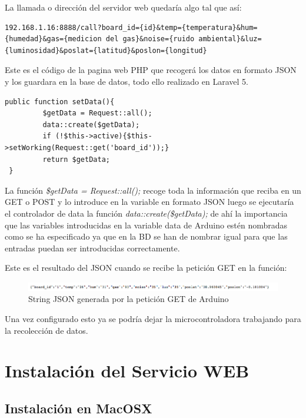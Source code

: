 La llamada o dirección del servidor web quedaría algo tal que así: 

\begin{lstlisting}[caption=Formato de la String GET, label=getstring]
	192.168.1.16:8888/call?board_id={id}&temp={temperatura}&hum={humedad}&gas={medicion del gas}&noise={ruido ambiental}&luz={luminosidad}&poslat={latitud}&poslon={longitud}
\end{lstlisting}

Este es el código de la pagina web PHP que recogerá los datos en formato JSON y los guardara en la base de datos, todo ello realizado en Laravel 5.

\begin{lstlisting}[caption=Controller que almacena la String en la BD, label=getstring]
 public function setData(){
		 $getData = Request::all();
		 data::create($getData);
		 if (!$this->active){$this->setWorking(Request::get('board_id'));}
		 return $getData;
 }
\end{lstlisting}

La función \textit{\$getData = Request::all();} recoge toda la información que reciba en un GET o POST y lo introduce en la variable en formato JSON luego se ejecutaría el controlador de data la función \textit{data::create(\$getData);} de ahí la importancia que las variables introducidas en la variable data de Arduino estén nombradas como se ha especificado ya que en la BD se han de nombrar igual para que las entradas puedan ser introducidas correctamente.

Este es el resultado del JSON cuando se recibe la petición GET en la función:

\begin{figure}[!h]
	\centering
	\includegraphics[width=1.0\linewidth]{figuras/jsonstring}
	\caption{String JSON generada por la petición GET de Arduino}
	\label{fig:montfin}
\end{figure}

Una vez configurado esto ya se podría dejar la microcontroladora trabajando para la recolección de datos.

\section{Instalación del Servicio WEB}
\subsection{Instalación en MacOSX}

